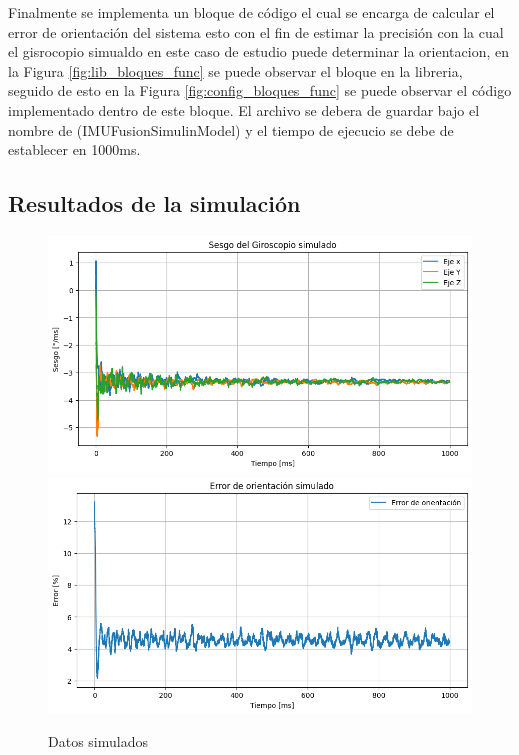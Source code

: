 Finalmente se implementa un bloque de código el cual se encarga de calcular el error de orientación del sistema esto con el fin de estimar la precisión con la cual el gisrocopio simualdo en este caso de estudio puede determinar la orientacion, en la Figura \ref{fig:lib_bloques_func} se puede observar el bloque en la libreria, seguido de esto en la Figura \ref{fig:config_bloques_func} se puede observar el código implementado dentro de este bloque. El archivo se debera de guardar bajo el nombre de (IMUFusionSimulinModel) y el tiempo de ejecucio se debe de establecer en 1000ms. 
\newpage

\subsection{Resultados de la simulación}\label{subsub:resultados_simulados_IMU}

\begin{figure}[htbp]
    \centering
    \includegraphics[scale=0.3]{fig/Capitulo5/Caso_de_estudio_IMU/data/simulated/sesgo_simulado.png}
    \vspace{1cm}
    \includegraphics[scale=0.3]{fig/Capitulo5/Caso_de_estudio_IMU/data/simulated/error_de_orientacion_simulado.png}
    \caption{Datos simulados}
    \label{fig:data_simulated}
\end{figure}

